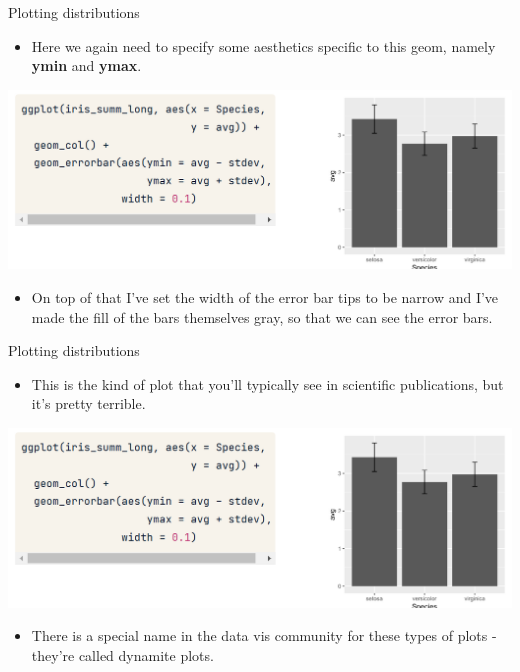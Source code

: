 \documentclass[
  ignorenonframetext,
]{beamer}
\providecommand{\tightlist}{%
  \setlength{\itemsep}{0pt}\setlength{\parskip}{0pt}}
\begin{document}
\begin{frame}{Plotting distributions}
\label{plotting-distributions-1}
\begin{itemize}
\tightlist
\item
  Here we again need to specify some aesthetics specific to this geom,
  namely \textbf{ymin} and \textbf{ymax}.
\end{itemize}

\includegraphics{../images/im209.png}

\begin{itemize}
\tightlist
\item
  On top of that I've set the width of the error bar tips to be narrow
  and I've made the fill of the bars themselves gray, so that we can see
  the error bars.
\end{itemize}
\end{frame}

\begin{frame}{Plotting distributions}
\label{plotting-distributions-2}
\begin{itemize}
\tightlist
\item
  This is the kind of plot that you'll typically see in scientific
  publications, but it's pretty terrible.
\end{itemize}

\includegraphics{../images/im209.png}

\begin{itemize}
\tightlist
\item
  There is a special name in the data vis community for these types of
  plots - they're called dynamite plots.
\end{itemize}
\end{frame}
\end{document}
